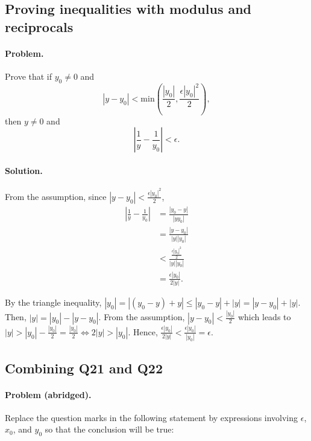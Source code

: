 \documentclass{article}
\begin{document}
\setcounter{subsection}{21}
\subsection{Proving inequalities with modulus and reciprocals}

\paragraph{Problem.} Prove that if $y_0 \neq 0$ and \begin{equation*}
  |y - y_0| < \text{min}\left(\frac{|y_0|}{2}, \frac{\epsilon|y_0|^2}{2}\right),
\end{equation*} then $y \neq 0$ and \begin{equation*}
  \left|\frac{1}{y} - \frac{1}{y_0}\right| < \epsilon.
\end{equation*}

\paragraph{Solution.} From the assumption, since $|y - y_0| <
\frac{\epsilon|y_0|^2}{2}$, \begin{align*}
  \left|\frac{1}{y} - \frac{1}{y_0}\right| &= \frac{|y_0 - y|}{|yy_0|} \\
    &= \frac{|y - y_0|}{|y||y_0|} \\
    &< \frac{\frac{\epsilon|y_0|^2}{2}}{|y||y_0|} \\
    &= \frac{\epsilon|y_0|}{2|y|}.
\end{align*}

By the triangle inequality, $|y_0| = |(y_0 - y) + y| \leq |y_0 - y| + |y| = |y
- y_0| + |y|$. Then, $|y| = |y_0| - |y - y_0|$. From the assumption, $|y - y_0|
< \frac{|y_0|}{2}$ which leads to $|y| > |y_0| - \frac{|y_0|}{2} =
\frac{|y_0|}{2} \iff 2|y| > |y_0|$. Hence, $\frac{\epsilon|y_0|}{2|y|} <
\frac{\epsilon|y_0|}{|y_0|} = \epsilon$.

\setcounter{subsection}{22}
\subsection{Combining Q21 and Q22}

\paragraph{Problem (abridged).} Replace the question marks in the following
statement by expressions involving $\epsilon$, $x_0$, and $y_0$ so that the
conclusion will be true:
\end{document}
